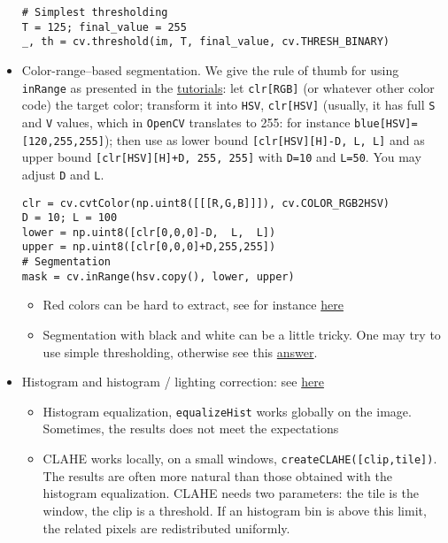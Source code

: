 \documentclass[a4paper,12pt,%
              final%
              ]{article}
\begin{document}
\begin{itemize}
\begin{verbatim}
# Simplest thresholding
T = 125; final_value = 255
_, th = cv.threshold(im, T, final_value, cv.THRESH_BINARY)
\end{verbatim}
  \item Color-range--based segmentation. We give the rule of thumb for using \texttt{inRange} as presented in the \href{https://docs.opencv.org/3.1.0/df/d9d/tutorial_py_colorspaces.html}{tutorials}: let \texttt{clr[RGB]} (or whatever other color code) the target color; transform it into \texttt{HSV}, \texttt{clr[HSV]} (usually, it has full \texttt{S} and \texttt{V} values, which in \texttt{OpenCV} translates to 255: for instance \texttt{blue[HSV]=[120,255,255]}); then use as lower bound \texttt{[clr[HSV][H]-D, L, L]} and as upper bound \texttt{[clr[HSV][H]+D, 255, 255]} with \texttt{D=10} and \texttt{L=50}. You may adjust \texttt{D} and \texttt{L}.
\begin{verbatim}
clr = cv.cvtColor(np.uint8([[[R,G,B]]]), cv.COLOR_RGB2HSV)
D = 10; L = 100
lower = np.uint8([clr[0,0,0]-D,  L,  L])
upper = np.uint8([clr[0,0,0]+D,255,255])
# Segmentation
mask = cv.inRange(hsv.copy(), lower, upper)
\end{verbatim}
    \begin{itemize}
      \item Red colors can be hard to extract, see for instance \href{https://stackoverflow.com/a/32523532}{here}
      \item Segmentation with black and white can be a little tricky. One may try to use simple thresholding, otherwise see this \href{https://stackoverflow.com/a/25401596}{answer}.
    \end{itemize}
  \item Histogram and histogram / lighting correction: see \href{https://docs.opencv.org/4.5.0/d5/daf/tutorial_py_histogram_equalization.html}{here}
    \begin{itemize}
      \item Histogram equalization, \verb|equalizeHist| works globally on the image. Sometimes, the results does not meet the expectations
      \item CLAHE works locally, on a small windows, \verb|createCLAHE([clip,tile])|. The results are often more natural than those obtained with the histogram equalization. CLAHE needs two parameters: the tile is the window, the clip is a threshold. If an histogram bin is above this limit, the related pixels are redistributed uniformly.
    \end{itemize}

\end{itemize}
\end{document}
